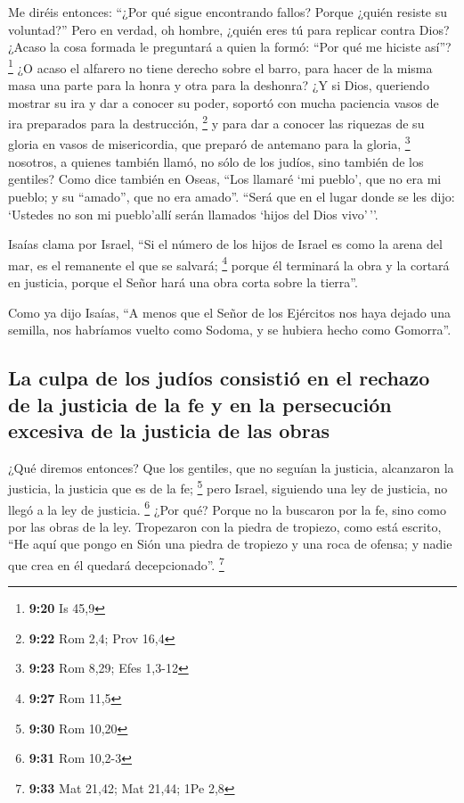 \begin{paracol}{2}
 Me diréis entonces: ``¿Por qué sigue encontrando fallos?
Porque ¿quién resiste su voluntad?''  Pero en verdad, oh
hombre, ¿quién eres tú para replicar contra Dios? ¿Acaso la cosa formada
le preguntará a quien la formó: ``Por qué me hiciste así''? \footnote{\textbf{9:20}
  Is 45,9}  ¿O acaso el alfarero no tiene derecho sobre
el barro, para hacer de la misma masa una parte para la honra y otra
para la deshonra?  ¿Y si Dios, queriendo mostrar su ira y
dar a conocer su poder, soportó con mucha paciencia vasos de ira
preparados para la destrucción, \footnote{\textbf{9:22} Rom 2,4; Prov
  16,4}  y para dar a conocer las riquezas de su gloria
en vasos de misericordia, que preparó de antemano para la gloria,
\footnote{\textbf{9:23} Rom 8,29; Efes 1,3-12}  nosotros,
a quienes también llamó, no sólo de los judíos, sino también de los
gentiles?  Como dice también en Oseas, ``Los llamaré `mi
pueblo', que no era mi pueblo; y su ``amado'', que no era amado''.
 ``Será que en el lugar donde se les dijo: `Ustedes no
son mi pueblo'allí serán llamados `hijos del Dios vivo'\,''.

 Isaías clama por Israel, ``Si el número de los hijos de
Israel es como la arena del mar, es el remanente el que se salvará;
\footnote{\textbf{9:27} Rom 11,5}  porque él terminará la
obra y la cortará en justicia, porque el Señor hará una obra corta sobre
la tierra''.

 Como ya dijo Isaías, ``A menos que el Señor de los
Ejércitos nos haya dejado una semilla, nos habríamos vuelto como Sodoma,
y se hubiera hecho como Gomorra''.

\hypertarget{la-culpa-de-los-juduxedos-consistiuxf3-en-el-rechazo-de-la-justicia-de-la-fe-y-en-la-persecuciuxf3n-excesiva-de-la-justicia-de-las-obras}{%
\subsection{La culpa de los judíos consistió en el rechazo de la
justicia de la fe y en la persecución excesiva de la justicia de las
obras}\label{la-culpa-de-los-juduxedos-consistiuxf3-en-el-rechazo-de-la-justicia-de-la-fe-y-en-la-persecuciuxf3n-excesiva-de-la-justicia-de-las-obras}}

 ¿Qué diremos entonces? Que los gentiles, que no seguían
la justicia, alcanzaron la justicia, la justicia que es de la fe;
\footnote{\textbf{9:30} Rom 10,20}  pero Israel,
siguiendo una ley de justicia, no llegó a la ley de justicia.
\footnote{\textbf{9:31} Rom 10,2-3}  ¿Por qué? Porque no
la buscaron por la fe, sino como por las obras de la ley. Tropezaron con
la piedra de tropiezo,  como está escrito, ``He aquí que
pongo en Sión una piedra de tropiezo y una roca de ofensa; y nadie que
crea en él quedará decepcionado''. \footnote{\textbf{9:33} Mat 21,42;
  Mat 21,44; 1Pe 2,8}


\end{paracol}
